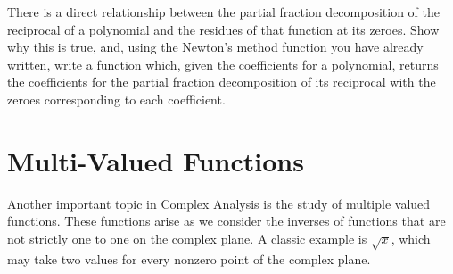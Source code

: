 \begin{problem}
There is a direct relationship between the partial fraction decomposition of the reciprocal of a polynomial and the residues of that function at its zeroes.
Show why this is true, and, using the Newton's method function you have already written, write a function which, given the coefficients for a polynomial, returns the coefficients for the partial fraction decomposition of its reciprocal with the zeroes corresponding to each coefficient.
\end{problem}
 
\section*{Multi-Valued Functions}

Another important topic in Complex Analysis is the study of multiple valued functions.
These functions arise as we consider the inverses of functions that are not strictly one to one on the complex plane.
A classic example is $\sqrt{x}$, which may take two values for every nonzero point of the complex plane.

